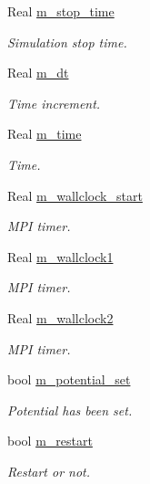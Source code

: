 \begin{DoxyCompactItemize}
Real \hyperlink{classplasma__engine_a148b332ad9c1d35b25b9479771502d3c}{m\+\_\+stop\+\_\+time}
\begin{DoxyCompactList}\small\item\em Simulation stop time. \end{DoxyCompactList}\item 
Real \hyperlink{classplasma__engine_ad747d24a60aec6bc61464941358f2a5e}{m\+\_\+dt}
\begin{DoxyCompactList}\small\item\em Time increment. \end{DoxyCompactList}\item 
Real \hyperlink{classplasma__engine_a6b74f07948066166ac42b087b2fa3fba}{m\+\_\+time}
\begin{DoxyCompactList}\small\item\em Time. \end{DoxyCompactList}\item 
Real \hyperlink{classplasma__engine_a91803bbb045ae9087c61744acde5e6a4}{m\+\_\+wallclock\+\_\+start}
\begin{DoxyCompactList}\small\item\em M\+PI timer. \end{DoxyCompactList}\item 
Real \hyperlink{classplasma__engine_adab190b38ee0eded079742d947bc04b7}{m\+\_\+wallclock1}
\begin{DoxyCompactList}\small\item\em M\+PI timer. \end{DoxyCompactList}\item 
Real \hyperlink{classplasma__engine_ae1d14f86a6556e643d8295a337b7578f}{m\+\_\+wallclock2}
\begin{DoxyCompactList}\small\item\em M\+PI timer. \end{DoxyCompactList}\item 
bool \hyperlink{classplasma__engine_ae8e57104b6f7135420f594840d6ec371}{m\+\_\+potential\+\_\+set}
\begin{DoxyCompactList}\small\item\em Potential has been set. \end{DoxyCompactList}\item 
bool \hyperlink{classplasma__engine_a3c9c6832efb6b89c27bb87f9b3c78709}{m\+\_\+restart}
\begin{DoxyCompactList}\small\item\em Restart or not. \end{DoxyCompactList}\item 

\end{DoxyCompactItemize}
